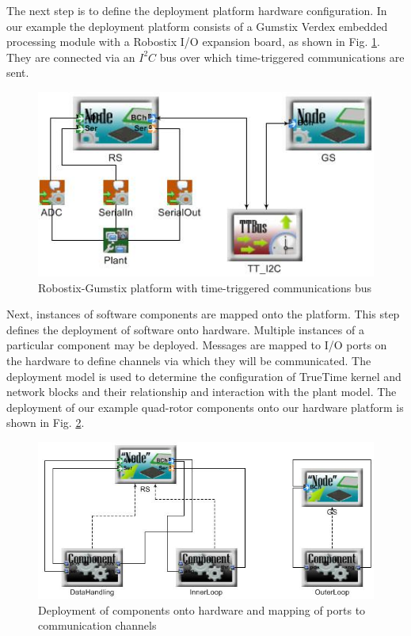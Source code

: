 The next step is to define the deployment platform hardware configuration.  In our example the deployment platform consists of a Gumstix Verdex embedded processing module with a Robostix I/O expansion board, as shown in Fig. \ref{fig:platform}.  They are connected via an $I^{2}C$ bus over which time-triggered communications are sent.
\begin{figure}[ht]
\centering
\includegraphics[width=\columnwidth]{figures/platform.jpg}
    \caption{Robostix-Gumstix platform with time-triggered communications bus}
    \label{fig:platform}
\end{figure}

Next, instances of software components are mapped onto the platform.  This step defines the deployment of software onto hardware.  Multiple instances of a particular component may be deployed.  Messages are mapped to I/O ports on the hardware to define channels via which they will be communicated.  The deployment model is used to determine the configuration of TrueTime kernel and network blocks and their relationship and interaction with the plant model.  The deployment of our example quad-rotor components onto our hardware platform is shown in Fig. \ref{fig:deployment}.
\begin{figure}[ht]
\centering
\includegraphics[width=\columnwidth]{figures/deployment.jpg}
    \caption{Deployment of components onto hardware and mapping of ports to communication channels}
    \label{fig:deployment}
\end{figure}

